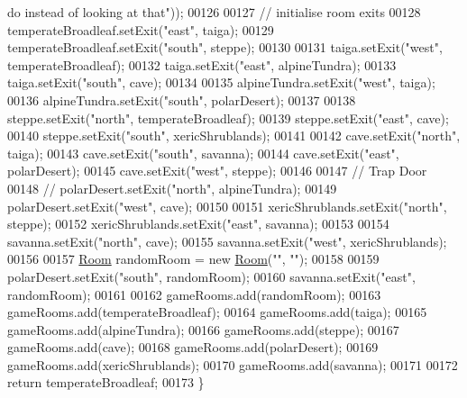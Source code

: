 \begin{DoxyCode}
{       do instead of looking at that"}));
00126 
00127         \textcolor{comment}{// initialise room exits}
00128         temperateBroadleaf.setExit(\textcolor{stringliteral}{"east"}, taiga);
00129         temperateBroadleaf.setExit(\textcolor{stringliteral}{"south"}, steppe);
00130 
00131         taiga.setExit(\textcolor{stringliteral}{"west"}, temperateBroadleaf);
00132         taiga.setExit(\textcolor{stringliteral}{"east"}, alpineTundra);
00133         taiga.setExit(\textcolor{stringliteral}{"south"}, cave);
00134 
00135         alpineTundra.setExit(\textcolor{stringliteral}{"west"}, taiga);
00136         alpineTundra.setExit(\textcolor{stringliteral}{"south"}, polarDesert);
00137 
00138         steppe.setExit(\textcolor{stringliteral}{"north"}, temperateBroadleaf);
00139         steppe.setExit(\textcolor{stringliteral}{"east"}, cave);
00140         steppe.setExit(\textcolor{stringliteral}{"south"}, xericShrublands);
00141 
00142         cave.setExit(\textcolor{stringliteral}{"north"}, taiga);
00143         cave.setExit(\textcolor{stringliteral}{"south"}, savanna);
00144         cave.setExit(\textcolor{stringliteral}{"east"}, polarDesert);
00145         cave.setExit(\textcolor{stringliteral}{"west"}, steppe);
00146 
00147         \textcolor{comment}{// Trap Door}
00148         \textcolor{comment}{// polarDesert.setExit("north", alpineTundra);}
00149         polarDesert.setExit(\textcolor{stringliteral}{"west"}, cave);
00150 
00151         xericShrublands.setExit(\textcolor{stringliteral}{"north"}, steppe);
00152         xericShrublands.setExit(\textcolor{stringliteral}{"east"}, savanna);
00153 
00154         savanna.setExit(\textcolor{stringliteral}{"north"}, cave);
00155         savanna.setExit(\textcolor{stringliteral}{"west"}, xericShrublands);
00156 
00157         \hyperlink{classpkg__world_1_1Room}{Room} randomRoom = \textcolor{keyword}{new} \hyperlink{classpkg__world_1_1Room}{Room}(\textcolor{stringliteral}{""}, \textcolor{stringliteral}{""});
00158 
00159         polarDesert.setExit(\textcolor{stringliteral}{"south"}, randomRoom);
00160         savanna.setExit(\textcolor{stringliteral}{"east"}, randomRoom);
00161 
00162         gameRooms.add(randomRoom);
00163         gameRooms.add(temperateBroadleaf);
00164         gameRooms.add(taiga);
00165         gameRooms.add(alpineTundra);
00166         gameRooms.add(steppe);
00167         gameRooms.add(cave);
00168         gameRooms.add(polarDesert);
00169         gameRooms.add(xericShrublands);
00170         gameRooms.add(savanna);
00171 
00172         \textcolor{keywordflow}{return} temperateBroadleaf;
00173     \}
\end{DoxyCode}


